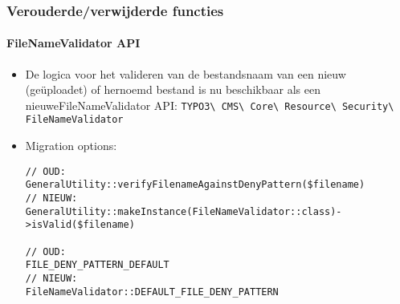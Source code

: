 
\begin{frame}[fragile]
	\frametitle{Verouderde/verwijderde functies}
	\framesubtitle{FileNameValidator API}

	\lstset{basicstyle=\tiny\ttfamily}

	\begin{itemize}
		\item De logica voor het valideren van de bestandsnaam van een nieuw (geüploadet) of
			hernoemd bestand is nu beschikbaar als een nieuweFileNameValidator API:\newline
			\small
				\texttt{TYPO3\textbackslash
					CMS\textbackslash
					Core\textbackslash
					Resource\textbackslash
					Security\textbackslash
					FileNameValidator}
			\normalsize

		\item Migration options:
\begin{lstlisting}
// OUD:
GeneralUtility::verifyFilenameAgainstDenyPattern($filename)
// NIEUW:
GeneralUtility::makeInstance(FileNameValidator::class)->isValid($filename)

// OUD:
FILE_DENY_PATTERN_DEFAULT
// NIEUW:
FileNameValidator::DEFAULT_FILE_DENY_PATTERN
\end{lstlisting}

	\end{itemize}

\end{frame}


